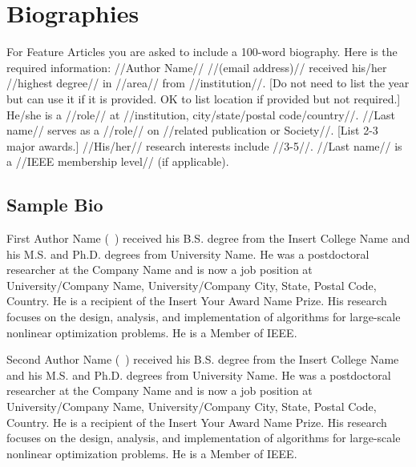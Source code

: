 \documentclass[11pt,draftcls,onecolumn,journal]{IEEEtran}
\begin{document}
\section*{Biographies}
\label{sec:bio}
For Feature Articles you are asked to include a 100-word biography. Here is the required information:
//Author Name// //(email address)// received his/her //highest degree// in //area// from //institution//. [Do not need to list the year but can use it if it is provided. OK to list location if provided but not required.] He/she is a //role// at //institution, city/state/postal code/country//. //Last name// serves as a //role// on //related publication or Society//. [List 2-3 major awards.] //His/her// research interests include //3-5//. //Last name// is a //IEEE membership level// (if applicable).
%
%

\subsection*{Sample Bio}
\begin{IEEEbiographynophoto}{First Author Name}
(~) received his B.S. degree from the Insert College Name and his M.S. and Ph.D. degrees from University Name. He was a postdoctoral researcher at the Company Name and is now a job position at University/Company Name, University/Company City, State, Postal Code, Country. He is a recipient of the Insert Your Award Name Prize. His research focuses on the design, analysis, and implementation of algorithms for large-scale nonlinear optimization problems. He is a Member of IEEE.
\end{IEEEbiographynophoto}
%
\vspace{11pt} %

\begin{IEEEbiographynophoto}{Second Author Name}
(~) received his B.S. degree from the Insert College Name and his M.S. and Ph.D. degrees from University Name. He was a postdoctoral researcher at the Company Name and is now a job position at University/Company Name, University/Company City, State, Postal Code, Country. He is a recipient of the Insert Your Award Name Prize. His research focuses on the design, analysis, and implementation of algorithms for large-scale nonlinear optimization problems. He is a Member of IEEE.
\end{IEEEbiographynophoto}

\vfill
\end{document}
